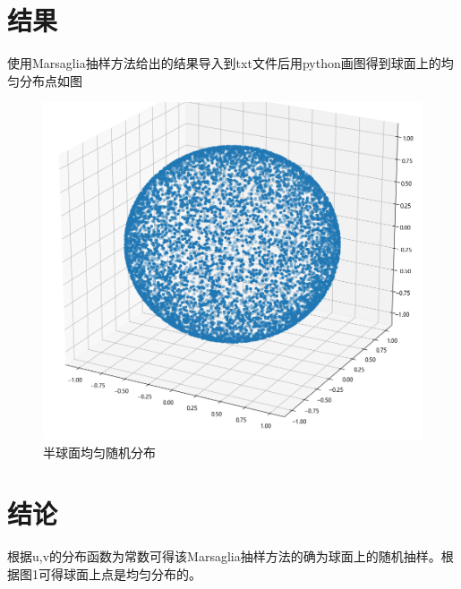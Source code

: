 \documentclass{article}
\begin{document}
\section{结果}
使用Marsaglia抽样方法给出的结果导入到txt文件后用python画图得到球面上的均匀分布点如图
\begin{figure}[!h]
	
	\centering
	\includegraphics[scale=0.5]{result_2_5}
	\caption{\heiti{}半球面均匀随机分布}
	
\end{figure}
	\section{结论}
	根据u,v的分布函数为常数可得该Marsaglia抽样方法的确为球面上的随机抽样。根据图1可得球面上点是均匀分布的。
\end{document}
